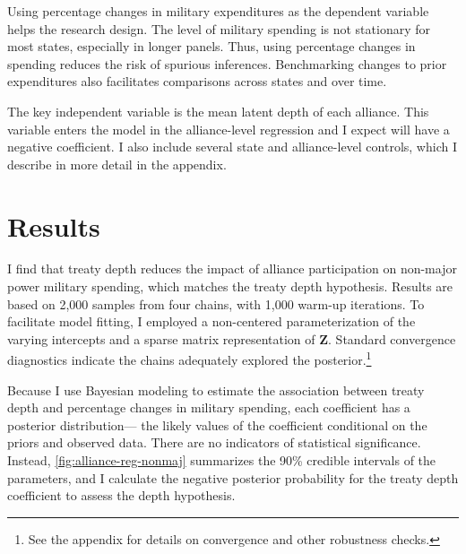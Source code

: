 \documentclass[12pt]{article}
\begin{document}
Using percentage changes in military expenditures as the dependent variable helps the research design. 
The level of military spending is not stationary for most states, especially in longer panels. 
Thus, using percentage changes in spending reduces the risk of spurious inferences.
Benchmarking changes to prior expenditures also facilitates comparisons across states and over time. 


The key independent variable is the mean latent depth of each alliance. 
This variable enters the model in the alliance-level regression and I expect will have a negative coefficient. 
I also include several state and alliance-level controls, which I describe in more detail in the appendix. 

 

\section*{Results}


I find that treaty depth reduces the impact of alliance participation on non-major power military spending, which matches the treaty depth hypothesis. 
Results are based on 2,000 samples from four chains, with 1,000 warm-up iterations. 
To facilitate model fitting, I employed a non-centered parameterization of the varying intercepts and a sparse matrix representation of \textbf{Z}. 
Standard convergence diagnostics indicate the chains adequately explored the posterior.\footnote{See the appendix for details on convergence and other robustness checks.} 


Because I use Bayesian modeling to estimate the association between treaty depth and percentage changes in military spending, each coefficient has a posterior distribution--- the likely values of the coefficient conditional on the priors and observed data.
There are no indicators of statistical significance. 
Instead, \autoref{fig:alliance-reg-nonmaj} summarizes the 90\% credible intervals of the parameters, and I calculate the negative posterior probability for the treaty depth coefficient to assess the depth hypothesis.
\end{document}
